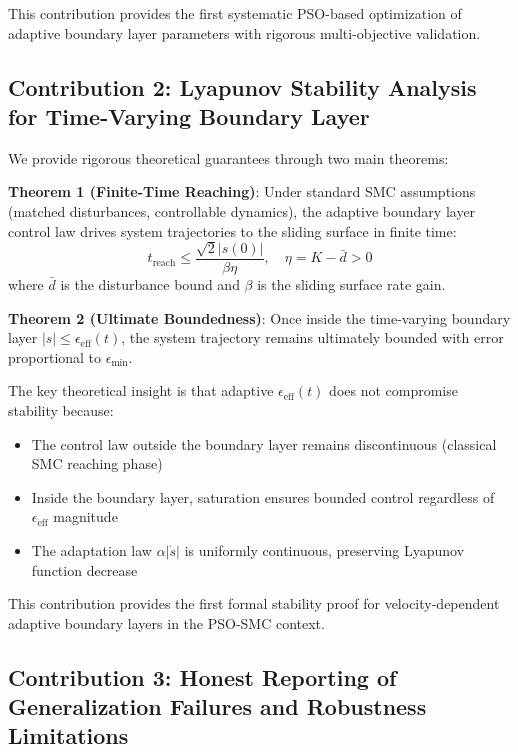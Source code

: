 This contribution provides the first systematic PSO-based optimization of adaptive boundary layer parameters with rigorous multi-objective validation.

\subsection{Contribution 2: Lyapunov Stability Analysis for Time-Varying Boundary Layer}

We provide rigorous theoretical guarantees through two main theorems:

\textbf{Theorem 1 (Finite-Time Reaching)}: Under standard SMC assumptions (matched disturbances, controllable dynamics), the adaptive boundary layer control law drives system trajectories to the sliding surface in finite time:
\begin{equation}
    t_{\text{reach}} \leq \frac{\sqrt{2}|s(0)|}{\beta \eta}, \quad \eta = K - \bar{d} > 0
\end{equation}
where $\bar{d}$ is the disturbance bound and $\beta$ is the sliding surface rate gain.

\textbf{Theorem 2 (Ultimate Boundedness)}: Once inside the time-varying boundary layer $|s| \leq \epsilon_{\text{eff}}(t)$, the system trajectory remains ultimately bounded with error proportional to $\epsilon_{\min}$.

The key theoretical insight is that adaptive $\epsilon_{\text{eff}}(t)$ does not compromise stability because:
\begin{itemize}
    \item The control law outside the boundary layer remains discontinuous (classical SMC reaching phase)
    \item Inside the boundary layer, saturation ensures bounded control regardless of $\epsilon_{\text{eff}}$ magnitude
    \item The adaptation law $\alpha|\dot{s}|$ is uniformly continuous, preserving Lyapunov function decrease
\end{itemize}

This contribution provides the first formal stability proof for velocity-dependent adaptive boundary layers in the PSO-SMC context.

\subsection{Contribution 3: Honest Reporting of Generalization Failures and Robustness Limitations}


